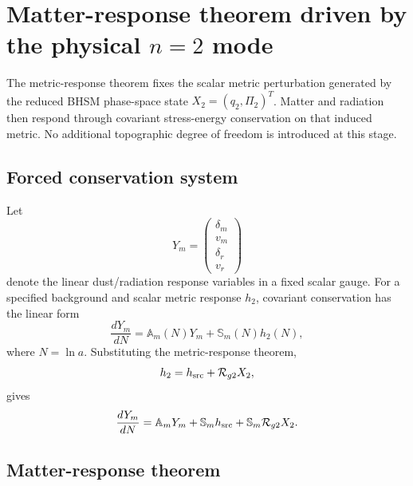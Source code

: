 \section{Matter-response theorem driven by the physical $n=2$ mode}
\label{sec:bhsm-matter-response}

The metric-response theorem fixes the scalar metric perturbation generated by
the reduced BHSM phase-space state $X_2=(q_2,\Pi_2)^T$.  Matter and radiation
then respond through covariant stress-energy conservation on that induced
metric.  No additional topographic degree of freedom is introduced at this
stage.

\subsection{Forced conservation system}

Let
\begin{equation}
Y_m
=
\begin{pmatrix}
\delta_m\\
v_m\\
\delta_r\\
v_r
\end{pmatrix}
\end{equation}
denote the linear dust/radiation response variables in a fixed scalar gauge.
For a specified background and scalar metric response $h_2$, covariant
conservation has the linear form
\begin{equation}
\frac{dY_m}{dN}
=
\mathbb A_m(N)Y_m
+
\mathbb S_m(N)h_2(N),
\label{eq:matter-forced-system}
\end{equation}
where $N=\ln a$.  Substituting the metric-response theorem,
\begin{equation}
h_2
=
h_{\rm src}
+
\mathcal R_{g2}X_2,
\end{equation}
gives
\begin{equation}
\frac{dY_m}{dN}
=
\mathbb A_mY_m
+
\mathbb S_m h_{\rm src}
+
\mathbb S_m\mathcal R_{g2}X_2 .
\label{eq:matter-forced-by-q2}
\end{equation}

\subsection{Matter-response theorem}

